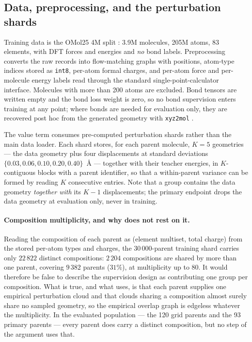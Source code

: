 \subsection{Data, preprocessing, and the perturbation shards}
\label{app:data}

Training data is the OMol25 4M split \citep{omol25}: 3.9M molecules,
205M atoms, 83 elements, with DFT forces and energies and \emph{no} bond labels.
Preprocessing converts the raw records into flow-matching graphs with
positions, atom-type indices stored as \texttt{int8}, per-atom formal charges, and
per-atom force and per-molecule energy labels read through the standard
single-point-calculator interface. Molecules with more than 200 atoms are
excluded. Bond tensors are written empty and the bond loss weight is zero, so no
bond supervision enters training at any point; where bonds are needed for
evaluation only, they are recovered post hoc from the generated geometry with
\texttt{xyz2mol} \citep{xyz2mol}.

The value term consumes pre-computed perturbation shards rather than the main
data loader. Each shard stores, for each parent molecule, $K = 5$ geometries ---
the data geometry plus four displacements at standard deviations
$\{0.03, 0.06, 0.10, 0.20, 0.40\}$~\AA{} --- together with their teacher energies,
in $K$-contiguous blocks with a parent identifier, so that a within-parent
variance can be formed by reading $K$ consecutive entries. Note that a group
contains the data geometry \emph{together with} its $K-1$ displacements; the
primary endpoint drops the data geometry at evaluation only, never in training.

\paragraph{Composition multiplicity, and why  does not rest on it.}
Reading the composition of each parent as (element multiset, total charge) from the
stored per-atom types and charges, the $30\,000$-parent training shard carries only
$22\,822$ distinct compositions: $2\,204$ compositions are shared by more than one
parent, covering $9\,382$ parents ($31\%$), at multiplicity up to $80$. It would
therefore be false to describe the supervision design as contributing one group per
composition. What is true, and what  uses, is that each parent
supplies one empirical perturbation cloud and that clouds sharing a composition
almost surely share no sampled geometry, so the empirical overlap graph is edgeless
whatever the multiplicity. In the evaluated population --- the 120 grid parents and
the 93 primary parents --- every parent does carry a distinct composition, but no
step of the argument uses that.


